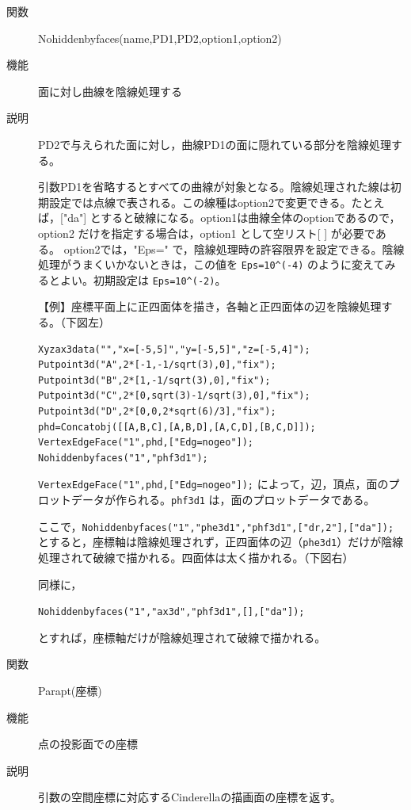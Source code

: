 \documentclass[papersize,a4paper,12pt,uplatex]{jsarticle}
\begin{document}
\begin{description}
\hypertarget{nohiddenbyfaces}{}
\item[関数]  Nohiddenbyfaces(name,PD1,PD2,option1,option2)
\item[機能]  面に対し曲線を陰線処理する
\item[説明]  PD2で与えられた面に対し，曲線PD1の面に隠れている部分を陰線処理する。

引数PD1を省略するとすべての曲線が対象となる。陰線処理された線は初期設定では点線で表される。この線種はoption2で変更できる。たとえば，["da"] とすると破線になる。option1は曲線全体のoptionであるので，option2 だけを指定する場合は，option1 として空リスト[ ] が必要である。
option2では，"Eps=" で，陰線処理時の許容限界を設定できる。陰線処理がうまくいかないときは，この値を \verb|Eps=10^(-4)| のように変えてみるとよい。初期設定は \verb|Eps=10^(-2)|。

\vspace{\baselineskip}
【例】座標平面上に正四面体を描き，各軸と正四面体の辺を陰線処理する。（下図左）
\begin{verbatim}
Xyzax3data("","x=[-5,5]","y=[-5,5]","z=[-5,4]");
Putpoint3d("A",2*[-1,-1/sqrt(3),0],"fix");
Putpoint3d("B",2*[1,-1/sqrt(3),0],"fix");
Putpoint3d("C",2*[0,sqrt(3)-1/sqrt(3),0],"fix");
Putpoint3d("D",2*[0,0,2*sqrt(6)/3],"fix");
phd=Concatobj([[A,B,C],[A,B,D],[A,C,D],[B,C,D]]);
VertexEdgeFace("1",phd,["Edg=nogeo"]);
Nohiddenbyfaces("1","phf3d1"); 
\end{verbatim}

  \verb|VertexEdgeFace("1",phd,["Edg=nogeo"]);| によって，辺，頂点，面のプロットデータが作られる。\verb|phf3d1| は，面のプロットデータである。
  
ここで，\verb|Nohiddenbyfaces("1","phe3d1","phf3d1",["dr,2"],["da"]); | とすると，座標軸は陰線処理されず，正四面体の辺（\verb|phe3d1|）だけが陰線処理されて破線で描かれる。四面体は太く描かれる。（下図右）
  
\vspace{\baselineskip}
  \begin{center}      \end{center}
同様に，

  \verb|Nohiddenbyfaces("1","ax3d","phf3d1",[],["da"]);|
  
とすれば，座標軸だけが陰線処理されて破線で描かれる。

\vspace{\baselineskip}
\hypertarget{parapt}{}
\item[関数]  Parapt(座標)
\item[機能]  点の投影面での座標
\item[説明]  引数の空間座標に対応するCinderellaの描画面の座標を返す。


\end{description}
\end{document}
